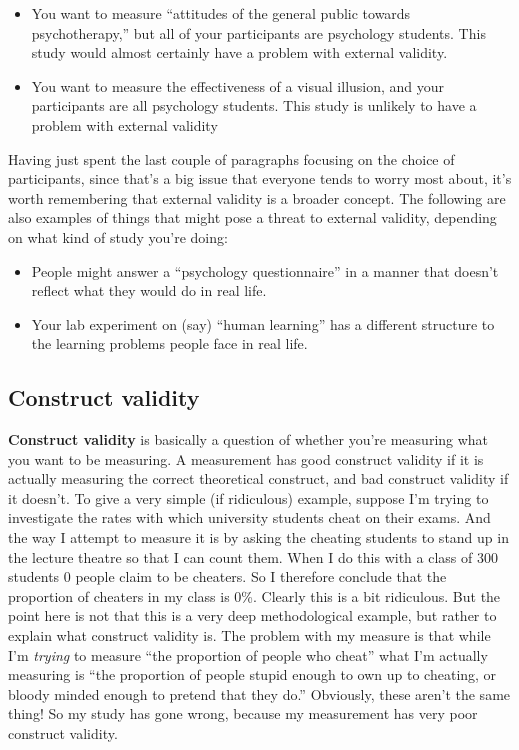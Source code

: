 \documentclass[
]{book}
\providecommand{\tightlist}{%
  \setlength{\itemsep}{0pt}\setlength{\parskip}{0pt}}
\begin{document}
\begin{itemize}
\tightlist
\item
  You want to measure ``attitudes of the general public towards psychotherapy,'' but all of your participants are psychology students. This study would almost certainly have a problem with external validity.
\item
  You want to measure the effectiveness of a visual illusion, and your participants are all psychology students. This study is unlikely to have a problem with external validity
\end{itemize}

Having just spent the last couple of paragraphs focusing on the choice of participants, since that's a big issue that everyone tends to worry most about, it's worth remembering that external validity is a broader concept. The following are also examples of things that might pose a threat to external validity, depending on what kind of study you're doing:

\begin{itemize}
\tightlist
\item
  People might answer a ``psychology questionnaire'' in a manner that doesn't reflect what they would do in real life.
\item
  Your lab experiment on (say) ``human learning'' has a different structure to the learning problems people face in real life.
\end{itemize}

\hypertarget{construct-validity}{%
\subsection{Construct validity}\label{construct-validity}}

{\textbf{Construct validity}} is basically a question of whether you're measuring what you want to be measuring. A measurement has good construct validity if it is actually measuring the correct theoretical construct, and bad construct validity if it doesn't. To give a very simple (if ridiculous) example, suppose I'm trying to investigate the rates with which university students cheat on their exams. And the way I attempt to measure it is by asking the cheating students to stand up in the lecture theatre so that I can count them. When I do this with a class of 300 students 0 people claim to be cheaters. So I therefore conclude that the proportion of cheaters in my class is 0\%. Clearly this is a bit ridiculous. But the point here is not that this is a very deep methodological example, but rather to explain what construct validity is. The problem with my measure is that while I'm \emph{trying} to measure ``the proportion of people who cheat'' what I'm actually measuring is ``the proportion of people stupid enough to own up to cheating, or bloody minded enough to pretend that they do.'' Obviously, these aren't the same thing! So my study has gone wrong, because my measurement has very poor construct validity.
\end{document}
